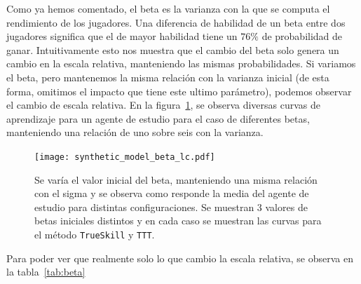 \documentclass[11pt,twoside,spanish]{report} %
\begin{document}
Como ya hemos comentado, el beta es la varianza con la que se computa el rendimiento de los jugadores.
Una diferencia de habilidad de un beta entre dos jugadores significa que el de mayor habilidad tiene un $76\%$ de probabilidad de ganar.
Intuitivamente esto nos muestra que el cambio del beta solo genera un cambio en la escala relativa, manteniendo las mismas probabilidades.
Si variamos el beta, pero mantenemos la misma relaci\'on con la varianza inicial (de esta forma, omitimos el impacto que tiene este ultimo par\'ametro), podemos observar el cambio de escala relativa.
En la figura~\ref{fig:beta_lc}, se observa diversas curvas de aprendizaje para un agente de estudio para el caso de diferentes betas, manteniendo una relaci\'on de uno sobre seis con la varianza.


\begin{figure}[H]
	\centering
	\texttt{[image: synthetic\_model\_beta\_lc.pdf]}
	\caption{Se var\'ia el valor inicial del beta, manteniendo una misma relaci\'on con el sigma y se observa como responde la media del agente de estudio para distintas configuraciones. Se muestran 3 valores de betas iniciales distintos y en cada caso se muestran las curvas para el m\'etodo \texttt{TrueSkill} y \texttt{TTT}.}
	\label{fig:beta_lc}
\end{figure}




Para poder ver que realmente solo lo que cambio la escala relativa, se observa en la tabla~\ref{tab:beta}
\end{document}
